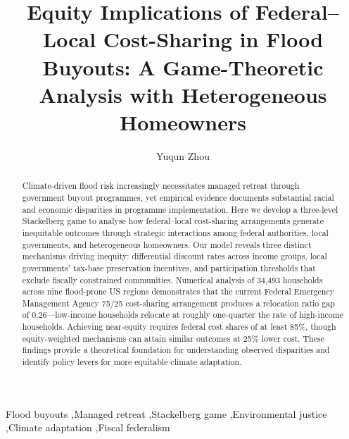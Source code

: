 \documentclass[preprint,12pt,authoryear]{elsarticle}
\begin{document}
\begin{frontmatter}

\title{Equity Implications of Federal--Local Cost-Sharing in Flood Buyouts: A Game-Theoretic Analysis with Heterogeneous Homeowners}

\author[wisc]{Yuqun Zhou}


\begin{abstract}
Climate-driven flood risk increasingly necessitates managed retreat through government buyout programmes, yet empirical evidence documents substantial racial and economic disparities in programme implementation. Here we develop a three-level Stackelberg game to analyse how federal--local cost-sharing arrangements generate inequitable outcomes through strategic interactions among federal authorities, local governments, and heterogeneous homeowners. Our model reveals three distinct mechanisms driving inequity: differential discount rates across income groups, local governments' tax-base preservation incentives, and participation thresholds that exclude fiscally constrained communities. Numerical analysis of 34,493 households across nine flood-prone US regions demonstrates that the current Federal Emergency Management Agency 75/25 cost-sharing arrangement produces a relocation ratio gap of 0.26---low-income households relocate at roughly one-quarter the rate of high-income households. Achieving near-equity requires federal cost shares of at least 85\%, though equity-weighted mechanisms can attain similar outcomes at 25\% lower cost. These findings provide a theoretical foundation for understanding observed disparities and identify policy levers for more equitable climate adaptation.
\end{abstract}

\begin{keyword}
Flood buyouts \sep Managed retreat \sep Stackelberg game \sep Environmental justice \sep Climate adaptation \sep Fiscal federalism
\end{keyword}

\end{frontmatter}

\linenumbers

\end{document}
